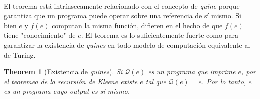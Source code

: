\documentclass[a4paper, 12pt]{article}
\newtheorem{theorem}{Theorem}
\newtheorem{theorem}{Theorem}
\begin{document}
~
~

El teorema está intrínsecamente relacionado con el concepto de \textit{quine}
porque garantiza que un programa puede operar sobre una referencia de sí mismo.
Si bien $e$ y $f(e)$ computan la misma función, difieren en el hecho de que
$f(e)$ tiene "conocimiento" de $e$. El teorema es lo suficientemente fuerte como
para garantizar la existencia de \textit{quines} en todo modelo de computación
equivalente al de Turing. 

\begin{theorem}[Existencia de \textit{quines}]
  Si $\mathcal{Q}(e)$ es un programa que imprime $e$, por el teoremea de la
  recursión de Kleene existe $e$ tal que $\mathcal{Q}(e) = e$. Por lo tanto, $e$
  es un programa cuyo output es sí mismo.
\end{theorem}
\end{document}
